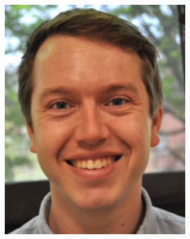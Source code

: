 \documentclass[landscape,a0b,final,a4resizeable]{include/a0poster}
\begin{document}
\begin{poster}
\begin{multicols}{3}
\begin{center}
\begin{minipage}[c]{0.2\columnwidth}
  \includegraphics[width=8cm]{photos/duvenaud.png}
  \captionsetup{labelformat=empty}
\end{minipage}
\end{center}
 
%
 

\end{multicols}
\end{poster}
\end{document}
